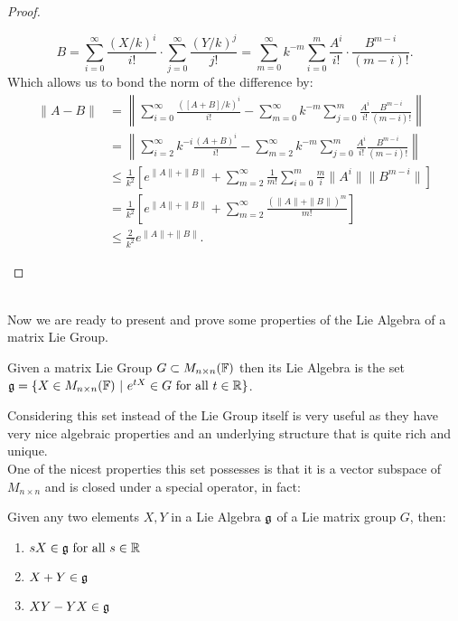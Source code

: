 \begin{proof}
\begin{enumerate}[label=(\alph*)]
		$$B=\sum_{i=0}^\infty \frac{(X/k)^i}{i!}\cdot  \sum_{j=0}^\infty   \frac{(Y/k)^j}{j!}= \sum_{m=0}^\infty k^{-m} \sum_{i=0}^m \frac{A^i}{i!}\cdot \frac{B^{m-i}}{(m-i)!}.$$
		Which allows us to bond the norm of the difference by:
		\begin{align*}
		\|A-B\| &= \left\|\sum_{i=0}^\infty \frac{([A+B]/k)^i}{i!} - \sum_{m=0}^\infty k^{-m} \sum_{j=0}^m \frac{A^i}{i!}\frac{B^{m-i}}{(m-i)!}\right\|\\
		&=\left\|\sum_{i=2}^\infty k^{-i}\frac{(A+B)^i}{i!} - \sum_{m=2}^\infty k^{-m}\sum_{j=0}^m \frac{A^i}{i!}\frac{B^{m-i}}{(m-i)!}\right\|\\
		&\le \frac{1}{k^2}\left[e^{\|A\|+\|B\|}+\sum_{m=2}^\infty \frac{1}{m!}\sum_{i=0}^m \frac{m}{i}\|A^i\| \|B^{m-i}\|\right]\\
		&= \frac{1}{k^2}\left[e^{\|A\|+\|B\|} + \sum_{m=2}^\infty \frac{(\|A\|+\|B\|)^m}{m!}\right]\\
		&\le \frac{2}{k^2}e^{\|A\|+\|B\|}.
		\end{align*}
	\end{enumerate}
\end{proof}\\
Now we are ready to present and prove some properties of the Lie Algebra of a matrix Lie Group.
\begin{defi}
	Given a matrix Lie Group $G\subset M_{n\times n}(\mathbb{F})$ then its Lie Algebra is the set $\mathfrak{g} = \{X \in M_{n\times n}(\mathbb{F})\ |\ e^{tX} \in G \text{ for all } t\in\mathbb{R}\}$.
	\label{LIEALGEBRAFROMMLG}
\end{defi}
Considering this set instead of the Lie Group itself is very useful as they have very nice algebraic properties and an underlying structure that is quite rich and unique.\\
One of the nicest properties this set possesses is that it is a vector subspace of $M_{n\times n}$ and is closed under a special operator, in fact:
\begin{prop}
Given any two elements $X,Y$ in a Lie Algebra $\mathfrak{g}$ of a Lie matrix group $G$, then:
\begin{enumerate}[label=(\alph*)]
	\item $sX \in \mathfrak{g} \text{ for all } s \in \mathbb{R}$
	\item $X+Y \in \mathfrak{g}$
	\item $XY-YX \in \mathfrak{g}$
\end{enumerate}
\end{prop}
\label{11LieAlgebraAxiomaticDeduction} 
